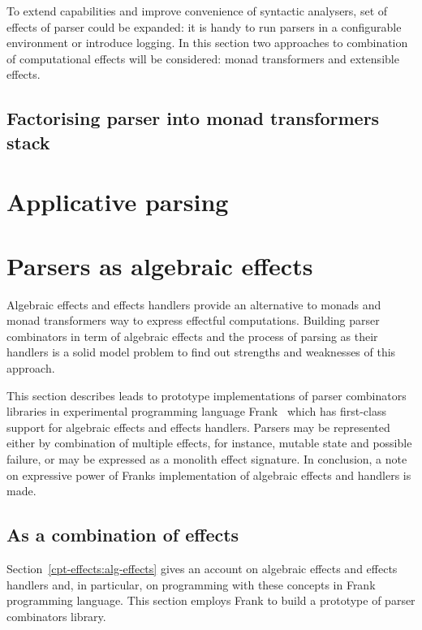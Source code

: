       To extend capabilities and improve convenience of syntactic analysers, set of
      effects of parser could be expanded: it is handy to run parsers in a configurable
      environment or introduce logging. In this section two approaches to combination
      of computational effects will be considered: monad transformers and extensible
      effects.

    \subsection{Factorising parser into monad transformers stack}

  \section{Applicative parsing}
  \label{cpt-parsers:applicative}

  \section{Parsers as algebraic effects}
  \label{cpt-parsers:alg-eff}

  Algebraic effects and effects handlers provide an alternative to monads and monad
  transformers way to express effectful computations. Building parser combinators in
  term of algebraic effects and the process of parsing as their handlers is a solid
  model problem to find out strengths and weaknesses of this approach.

  This section describes leads to prototype implementations of parser
  combinators libraries in experimental programming language
  Frank~\cite{DBLP:conf/popl/LindleyMM17} which has first-class support for
  algebraic effects and effects handlers. Parsers may be represented either by
  combination of multiple effects, for instance, mutable state and possible failure,
  or may be expressed as a monolith effect signature. In conclusion, a
  note on expressive power of Franks implementation of algebraic effects and
  handlers is made.

  \subsection{As a combination of effects}

    Section~\ref{cpt-effects:alg-effects} gives an account on algebraic effects and
    effects handlers and, in particular, on programming with these concepts in Frank
    programming language. This section employs Frank to build a prototype of parser
    combinators library.

